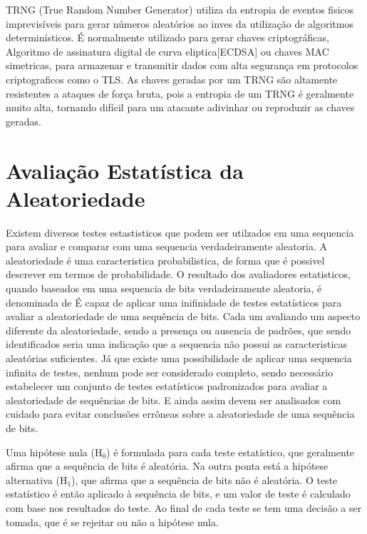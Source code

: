         TRNG (True Random Number Generator) utiliza da entropia de eventos fisicos imprevisíveis para gerar números aleatórios ao inves da utilização de algoritmos determinísticos. 
        É normalmente utilizado para gerar chaves criptográficas, Algoritmo de assinatura digital de curva eliptica[ECDSA] ou chaves MAC simetricas, para armazenar e transmitir dados com alta segurança em protocolos criptograficos como o TLS.\@
        As chaves geradas por um TRNG são altamente resistentes a ataques de força bruta, pois a entropia de um TRNG é geralmente muito alta, tornando difícil para um atacante adivinhar ou reproduzir as chaves geradas.

    \section{Avaliação Estatística da Aleatoriedade}
        
        Existem diversos testes estastisticos que podem ser utilzados em uma sequencia para avaliar e comparar com uma sequencia verdadeiramente aleatoria. 
        A aleatoriedade é uma caracteristica probabilistica, de forma que é possivel descrever em termos de probabilidade. O resultado dos avaliadores estatisticos, quando baseados em uma sequencia de bits verdadeiramente aleatoria, é denominada de  %
        É capaz de aplicar uma inifinidade de testes estatísticos para avaliar a aleatoriedade de uma sequência de bits. Cada um avaliando um aspecto diferente da aleatoriedade, 
        sendo a presença ou ausencia de padrões, que sendo identificados seria uma indicação que a sequencia não possui as caracteristicas aleatórias suficientes.
        Já que existe uma possibilidade de aplicar uma sequencia infinita de testes, nenhum pode ser considerado completo, sendo necessário estabelecer um conjunto de testes estatísticos padronizados para avaliar a aleatoriedade de sequências de bits. E ainda assim devem ser analisados
        com cuidado para evitar conclusões errôneas sobre a aleatoriedade de uma sequência de bits.

        Uma hipótese nula (H$_0$) é formulada para cada teste estatístico, que geralmente afirma que a sequência de bits é aleatória. 
        Na outra ponta está a hipótese alternativa (H$_1$), que afirma que a sequência de bits não é aleatória. 
        O teste estatístico é então aplicado à sequência de bits, e um valor de teste é calculado com base nos resultados do teste. Ao final de cada teste se tem uma decisão a ser tomada, que é se rejeitar ou não a hipótese nula.

